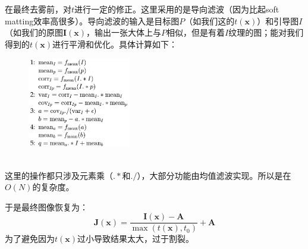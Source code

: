 \documentclass[12pt]{article}
\begin{document}
在最终去雾前，对$t$进行一定的修正。这里采用的是导向滤波（因为比起soft matting效率高很多）。导向滤波的输入是目标图$P$（如我们这的$t(\bm{x})$）和引导图$I$（如我们的原图$\bm{I}(\bm{x})$，输出一张大体上与$P$相似，但是有着$I$纹理的图；能对我们得到的$t(\bm{x})$进行平滑和优化。具体计算如下：
\begin{figure}[h]
    \centering
    \includegraphics[width=0.4\textwidth]{dip4.jpg}
\end{figure}\\
这里的操作都只涉及元素乘（$.*$和$./$），大部分功能由均值滤波实现。所以是在$O(N)$的复杂度。\par
于是最终图像恢复为：\begin{equation}\label{eqn-1} 
  \bm{J}(\bm{x})=\frac{\bm{I}(\bm{x})-\bm{A}}{\max(t(\bm{x}),t_0)}+\bm{A}
\end{equation}
为了避免因为$t(\bm{x})$过小导致结果太大，过于割裂。
\\
\end{document}
